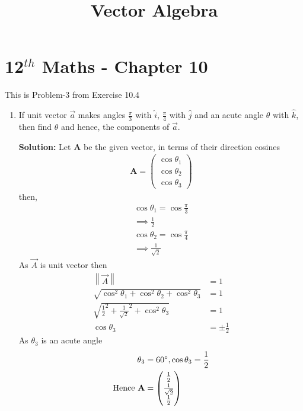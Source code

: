 \documentclass[12pt]{article}
\providecommand{\norm}[1]{\left\lVert#1\right\rVert}
\newcommand{\solution}{\noindent \textbf{Solution: }}
\newcommand{\myvec}[1]{\ensuremath{\begin{pmatrix}#1\end{pmatrix}}}
\let\vec\mathbf
\begin{document}
\begin{center}
\enlargethispage{-4cm}
\title{\textbf{Vector Algebra}}
\date{\vspace{-5ex}} %
\maketitle
\end{center}
\setcounter{page}{1}
\section*{12$^{th}$ Maths - Chapter 10}
This is Problem-3 from Exercise 10.4
\begin{enumerate}
\item If unit vector $\overrightarrow{a}$ makes angles $\frac{\pi}{3}$ with $\hat{i}$, $\frac{\pi}{4}$ with $\hat{j}$ and an acute angle $\theta$ with $\hat{k}$, then find $\theta$ and hence, the components of $\overrightarrow{a}$.

\solution
		Let $\vec{A}$ be the given vector, in terms of their direction cosines 
		\begin{align}
			\vec{A}=\myvec{\cos\theta_1\\\cos\theta_2\\\cos\theta_3}
		\end{align}
then,
		\begin{align}
			\cos\theta_1=\cos\frac{\pi}{3}\\
			\implies\frac{1}{2}\\
			\cos\theta_2=\cos\frac{\pi}{4}\\
			\implies \frac{1}{\sqrt{2}}
		\end{align}
As $\Vec{A}$ is unit vector then
\begin{align}
    \norm{\Vec{A}}&=1\\
    \sqrt{\cos^2\theta_1+\cos^2\theta_2+\cos^2\theta_3}&=1\\
    \sqrt{\frac{1}{2}^2+\frac{1}{\sqrt{2}}^2+\cos^2\theta_3 }&=1\\
    \cos\theta_3 &=\pm\frac{1}{2}
\end{align}
As $\theta_3$ is an acute angle
\begin{align}
    \theta_3&=60\degree, \cos\theta_3=\frac{1}{2}\\
    \text{Hence }\vec{A}&=\myvec{\frac{1}{2}\\[2pt] \frac{1}{\sqrt{2}}\\[2pt] \frac{1}{2}}
\end{align}
\end{enumerate}
\end{document}
